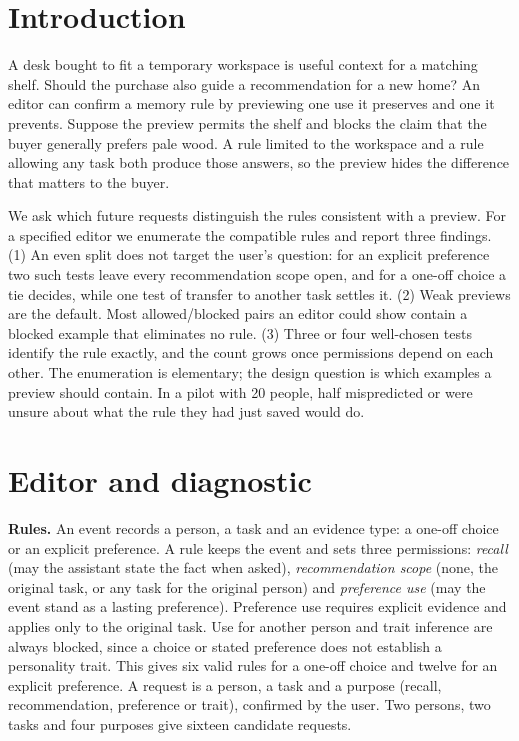 \documentclass[manuscript,review]{acmart}
\begin{document}
\section{Introduction}
A desk bought to fit a temporary workspace is useful context for a matching shelf. Should the purchase also guide a recommendation for a new home? An editor can confirm a memory rule by previewing one use it preserves and one it prevents. Suppose the preview permits the shelf and blocks the claim that the buyer generally prefers pale wood. A rule limited to the workspace and a rule allowing any task both produce those answers, so the preview hides the difference that matters to the buyer.

We ask which future requests distinguish the rules consistent with a preview. For a specified editor we enumerate the compatible rules and report three findings. (1) An even split does not target the user's question: for an explicit preference two such tests leave every recommendation scope open, and for a one-off choice a tie decides, while one test of transfer to another task settles it. (2) Weak previews are the default. Most allowed/blocked pairs an editor could show contain a blocked example that eliminates no rule. (3) Three or four well-chosen tests identify the rule exactly, and the count grows once permissions depend on each other. The enumeration is elementary; the design question is which examples a preview should contain. In a pilot with 20 people, half mispredicted or were unsure about what the rule they had just saved would do.



\section{Editor and diagnostic}
\textbf{Rules.} An event records a person, a task and an evidence type: a one-off choice or an explicit preference. A rule keeps the event and sets three permissions: \emph{recall} (may the assistant state the fact when asked), \emph{recommendation scope} (none, the original task, or any task for the original person) and \emph{preference use} (may the event stand as a lasting preference). Preference use requires explicit evidence and applies only to the original task. Use for another person and trait inference are always blocked, since a choice or stated preference does not establish a personality trait. This gives six valid rules for a one-off choice and twelve for an explicit preference. A request is a person, a task and a purpose (recall, recommendation, preference or trait), confirmed by the user. Two persons, two tasks and four purposes give sixteen candidate requests.
\end{document}
